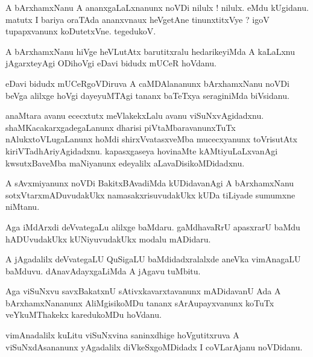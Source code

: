 \documentclass{article}
\begin{document}
\begin{mn}%
A bArxhamxNanu A ananxgaLaLxnanunx noVDi nilulx ! nilulx. eMdu kUgidanu. matutx I bariya oraTAda 
ananxvnaux heVgetAne tinunxtitxVye ? igoV tupapxvanunx koDutetxVne. tegedukoV.
\end{mn}

\begin{mn}%
A bArxhamxNanu hiVge heVLutAtx barutitxralu hedarikeyiMda A kaLaLxnu jAgarxteyAgi ODihoVgi eDavi 
bidudx mUCeR hoVdanu.
\end{mn}

\begin{mn}%
eDavi bidudx mUCeRgoVDiruva A caMDAlananunx bArxhamxNanu noVDi beVga alilxge hoVgi dayeyuMTAgi 
tananx baTeTxya seraginiMda biVsidanu.
\end{mn}

\begin{mn}%
anaMtara avanu ececxtutx meVlakekxLalu avanu viSuNxvAgidadxnu. shaMKacakarxgadegaLanunx dharisi 
piVtaMbaravanunxTuTx nAlukxtoVLugaLanunx hoMdi shirxVvatasxveMba mucecxyanunx toVrisutAtx 
kiriVTadhAriyAgidadxnu. kapasxgaseya hovinaMte kAMtiyuLaLxvanAgi kwsutxBaveMba maNiyanunx 
edeyalilx aLavaDisikoMDidadxnu.
\end{mn}

\begin{mn}%
A sAvxmiyanunx noVDi BakitxBAvadiMda kUDidavanAgi A bArxhamxNanu sotxVtarxmADuvudakUkx 
namasakxrisuvudakUkx kUDa tiLiyade sumumxne niMtanu.
\end{mn}

\begin{mn}%
Aga iMdArxdi deVvategaLu alilxge baMdaru. gaMdhavaRrU apasxrarU baMdu hADUvudakUkx kUNiyuvudakUkx 
modalu mADidaru.
\end{mn}

\begin{mn}%
A jAgadalilx deVvategaLU QuSigaLU baMdidadxralalxde aneVka vimAnagaLU baMduvu. dAnavAdayxgaLiMda A 
jAgavu tuMbitu.
\end{mn}

\begin{mn}%
Aga viSuNxvu savxBakatxnU sAtivxkavarxtavanunx mADidavanU Ada A bArxhamxNananunx AliMgisikoMDu 
tananx sArAupayxvanunx koTuTx veYkuMThakekx karedukoMDu hoVdanu.
\end{mn}

\begin{mn}%
vimAnadalilx kuLitu viSuNxvina saninxdhige hoVgutitxruva A viSuNxdAsananunx yAgadalilx 
diVkeSxgoMDidadx I coVLarAjanu noVDidanu. 
\end{mn}
\end{document}
